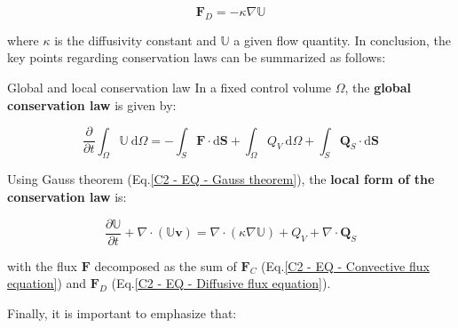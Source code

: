 \vspace{-1mm}
\begin{equation}
	\mathbf{F}_D = - \kappa \nabla \mathbb{U}
	\label{C2 - EQ - Diffusive flux equation}
\end{equation}
\vspace{-1em}

where $\kappa$ is the diffusivity constant and $\mathbb{U}$ a given flow quantity. In conclusion,  the key points regarding conservation laws can be summarized as follows:

\vspace{3mm}
\begin{box_definition}{Global and local conservation law}
In a fixed control volume $\Omega$, the \textbf{global conservation law} is given by:

\begin{equation}
\frac{\partial}{\partial t} \int_{\Omega} \mathbb{U} \mathrm{~d} \Omega = - \int_S \mathbf{F} \cdot \mathrm{d} \mathbf{S} + \int_{\Omega} Q_V \mathrm{~d} \Omega + \int_S \mathbf{Q}_S \cdot \mathrm{d} \mathbf{S}
\label{C2 - EQ - General equation for the general conservation law}
\end{equation}
\vspace{-0.1em}

Using Gauss theorem (Eq.\ref{C2 - EQ - Gauss theorem}), the \textbf{local form of the conservation law} is:

\begin{equation}
\frac{\partial \mathbb{U}}{\partial t}+\nabla \cdot(\mathbb{U} \mathbf{v})=\nabla \cdot(\kappa \nabla \mathbb{U})+Q_V+\nabla \cdot \mathbf{Q}_S
\label{C2 - EQ - General equation for the local conservation law}
\end{equation}
\vspace{-0.1em}

with the flux $\mathbf{F}$ decomposed as the sum of $\mathbf{F}_C$ (Eq.\ref{C2 - EQ - Convective flux equation}) and $\mathbf{F}_D$ (Eq.\ref{C2 - EQ - Diffusive flux equation}).
\end{box_definition}
\vspace{1mm}

Finally, it is important to emphasize that:


